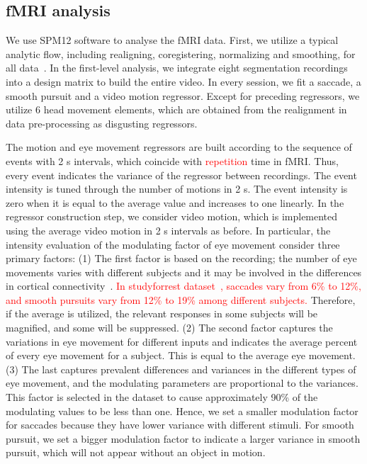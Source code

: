 \documentclass[final,3p,times,twocolumn]{elsarticle}
\begin{document}
\subsection{fMRI analysis}
We use SPM12 software to analyse the fMRI data. 
First, we utilize a typical analytic flow, including realigning, coregistering, normalizing and smoothing, for all data~\cite{fMRI_handbook}. 
In the first-level analysis, we integrate eight segmentation recordings into a design matrix to build the entire video. 
In every session, we fit a saccade, a smooth pursuit and a video motion regressor. 
Except for preceding regressors, we utilize 6 head movement elements, which are obtained from the realignment in data pre-processing as disgusting regressors. 


The motion and eye movement regressors are built according to the sequence of events with 2 s intervals, which coincide with \textcolor{red}{repetition} time in fMRI. 
Thus, every event indicates the variance of the regressor between recordings. 
The event intensity is tuned through the number of motions in 2 s.
The event intensity is zero when it is equal to the average value 
and increases to one linearly. 
In the regressor construction step, we consider video motion, 
which is implemented using the average video motion in 2 s intervals as before. 
In particular, the intensity evaluation of the modulating factor of eye movement consider three primary factors: 
(1) The first factor is based on the recording;
the number of eye movements varies with different subjects 
and it may be involved in the differences in cortical connectivity~\cite{individual_variability}. 
\textcolor{red}{
In studyforrest dataset~\cite{gaze_forrest}, saccades vary from 6\% to 12\%, and smooth pursuits vary from 12\% to 19\% among different subjects.}
Therefore, if the average is utilized, the relevant responses in some subjects will be magnified, and some will be suppressed. 
(2) The second factor captures the variations in eye movement for different inputs 
and indicates the average percent of every eye movement for a subject. 
This is equal to the average eye movement. 
(3) The last captures prevalent differences and variances in the different types of eye movement, 
and the modulating parameters are proportional to the variances. 
This factor is selected in the dataset to cause approximately 90\% of the modulating values to be less than one. 
Hence, we set a smaller modulation factor for saccades because they have lower variance with different stimuli. 
For smooth pursuit, we set a bigger modulation factor to indicate a larger variance in smooth pursuit, 
which will not appear without an object in motion.
\end{document}
